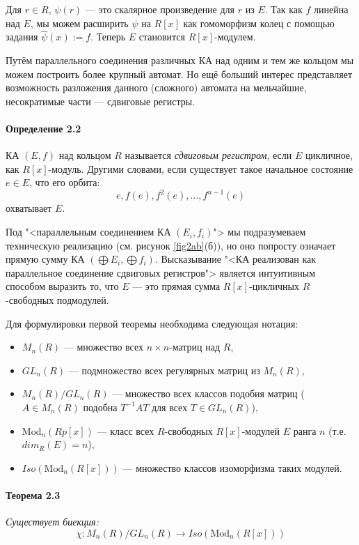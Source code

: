 \documentclass[a4paper,12pt]{article}
\newcommand{\Mod}{\text{Mod}}
\begin{document}
Для $r \in R$, $\psi(r)$ --- это скалярное произведение для $r$ из $E$. Так как $f$ линейна над $E$, мы можем расширить $\psi$ на $R[x]$ как гомоморфизм колец с помощью задания $\hat{\psi}(x) := f$. Теперь $E$ становится $R[x]$-модулем.

Путём параллельного соединения различных КА над одним и тем же кольцом мы можем построить более крупный автомат. Но ещё больший интерес представляет возможность разложения данного (сложного) автомата на мельчайшие, несократимые части --- сдвиговые регистры.

\paragraph{Определение 2.2}
КА $(E,f)$ над кольцом $R$ называется \textit{сдвиговым регистром}, если $E$ цикличное, как $R[x]$-модуль. Другими словами, если существует такое начальное состояние $e \in E$, что его орбита:
$$
e, f(e), f^2(e), ..., f^{n-1}(e)
$$
охватывает $E$.

Под "<параллельным соединением КА $(E_i, f_i)$"> мы подразумеваем техническую реализацию (см. рисунок \ref{fig2ab}(б)), но оно попросту означает прямую сумму КА $(\bigoplus{E_i}, \bigoplus{f_i})$. Высказывание "<КА реализован как параллельное соединение сдвиговых регистров"> является интуитивным способом выразить то, что $E$ --- это прямая сумма $R[x]$-цикличных $R$-свободных подмодулей.

Для формулировки первой теоремы необходима следующая нотация:

\begin{itemize}
	\item $M_n(R)$ --- множество всех $n \times n$-матриц над $R$,
	\item $GL_n(R)$ --- подмножество всех регулярных матриц из $M_n(R)$,
	\item $M_n(R)/GL_n(R)$ --- множество всех классов подобия матриц ($A \in M_n(R)$ подобна $T^{-1}AT$ для всех $T \in GL_n(R)$),
	\item $\Mod_n(Rp[x])$ --- класс всех $R$-свободных $R[x]$-модулей $E$ ранга $n$ (т.е. $dim_R(E) = n$),
	\item $Iso(\Mod_n(R[x]))$ --- множество классов изоморфизма таких модулей.
\end{itemize}


\paragraph{Теорема 2.3}{\itshape
Существует биекция:
$$
\chi : M_n(R)/GL_n(R) \rightarrow Iso(\Mod_n(R[x]))
$$
}
\end{document}
